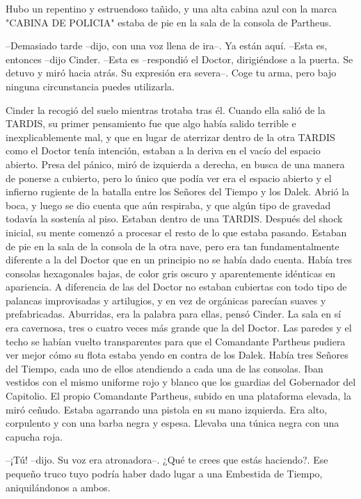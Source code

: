 Hubo un repentino y estruendoso tañido, y una alta cabina azul con la marca "CABINA DE POLICIA" estaba de pie en la sala de la consola de Partheus.

--Demasiado tarde --dijo, con una voz llena de ira--. Ya están aquí.
--Esta es, entonces --dijo Cinder.
--Esta es --respondió el Doctor, dirigiéndose a la puerta. Se detuvo y miró hacia atrás. Su expresión era severa--. Coge tu arma, pero bajo ninguna circunstancia puedes utilizarla.

Cinder la recogió del suelo mientras trotaba tras él. Cuando ella salió de la TARDIS, su primer pensamiento fue que algo había salido terrible e inexplicablemente mal, y que en lugar de aterrizar dentro de la otra TARDIS como el Doctor tenía intención, estaban a la deriva en el vacío del espacio abierto.
Presa del pánico, miró de izquierda a derecha, en busca de una manera de ponerse a cubierto, pero lo único que podía ver era el espacio abierto y el infierno rugiente de la batalla entre los Señores del Tiempo y los Dalek.
Abrió la boca, y luego se dio cuenta que aún respiraba, y que algún tipo de gravedad todavía la sostenía al piso. Estaban dentro de una TARDIS.
Después del shock inicial, su mente comenzó a procesar el resto de lo que estaba pasando. Estaban de pie en la sala de la consola de la otra nave, pero era tan fundamentalmente diferente a la del Doctor que en un principio no se había dado cuenta. Había tres consolas hexagonales bajas, de color gris oscuro y aparentemente idénticas en apariencia. A diferencia de las del Doctor no estaban cubiertas con todo tipo de palancas improvisadas y artilugios, y en vez de orgánicas parecían suaves y prefabricadas. Aburridas, era la palabra para ellas, pensó Cinder.
La sala en sí era cavernosa, tres o cuatro veces más grande que la del Doctor. Las paredes y el techo se habían vuelto transparentes para que el Comandante Partheus pudiera ver mejor cómo su flota estaba yendo en contra de los Dalek.
Había tres Señores del Tiempo, cada uno de ellos atendiendo a cada una de las consolas. Iban vestidos con el mismo uniforme rojo y blanco que los guardias del Gobernador del Capitolio.
El propio Comandante Partheus, subido en una plataforma elevada, la miró ceñudo. Estaba agarrando una pistola en su mano izquierda. Era alto, corpulento y con una barba negra y espesa. Llevaba una túnica negra con una capucha roja. 

--¡Tú! --dijo. Su voz era atronadora--. ¿Qué te crees que estás haciendo?. Ese pequeño truco tuyo podría haber dado lugar a una Embestida de Tiempo, aniquilándonos a ambos.


